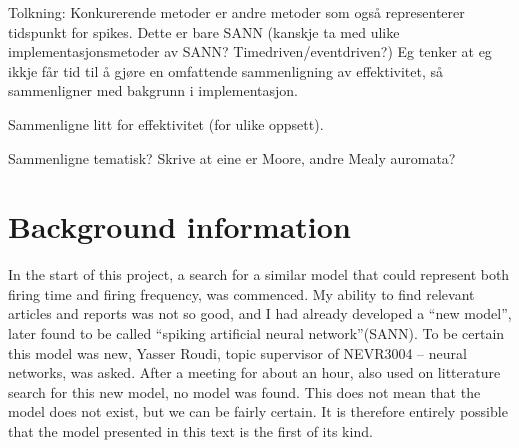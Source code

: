 \documentclass[a4paper,11 pt]{report}
\begin{document}
Tolkning:
Konkurerende metoder er andre metoder som også representerer tidspunkt for spikes. Dette er bare SANN (kanskje ta med ulike implementasjonsmetoder av SANN? Timedriven/eventdriven?)
Eg tenker at eg ikkje får tid til å gjøre en omfattende sammenligning av effektivitet, så sammenligner med bakgrunn i implementasjon. 

Sammenligne litt for effektivitet (for ulike oppsett).

Sammenligne tematisk? Skrive at eine er Moore, andre Mealy auromata?


\tableofcontents








\chapter{Background information} 	%
In the start of this project, a search for a similar model that could represent both firing time and firing frequency, was commenced.
My ability to find relevant articles and reports was not so good, and
 	I had already developed a ``new model'', later found to be called ``spiking artificial neural network''(SANN).
To be certain this model was new, Yasser Roudi, topic supervisor of NEVR3004 -- neural networks, was asked. 
After a meeting for about an hour, also used on litterature search for this new model, no model was found.
This does not mean that the model does not exist, but we can be fairly certain.
It is therefore entirely possible that the model presented in this text is the first of its kind.
\end{document}
